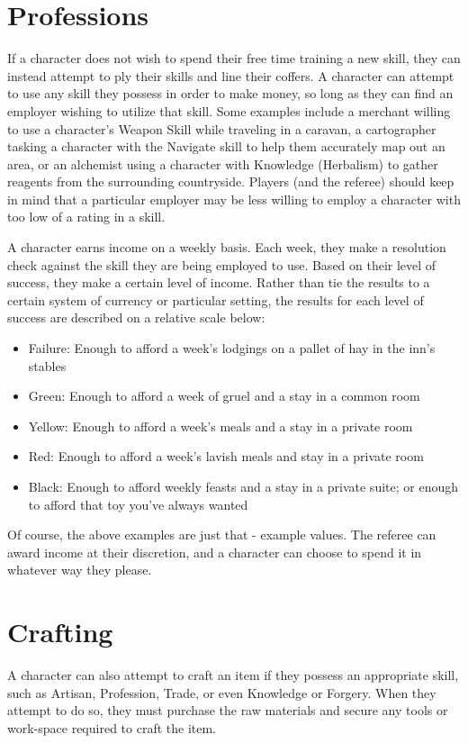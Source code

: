 \documentclass[oneside]{book}
\begin{document}
\begin{multicols}{2}
\section{Professions}

If a character does not wish to spend their free time training a new skill, they can instead attempt to ply their skills and line their coffers. A character can attempt to use any skill they possess in order to make money, so long as they can find an employer wishing to utilize that skill. Some examples include a merchant willing to use a character's Weapon Skill while traveling in a caravan, a cartographer tasking a character with the Navigate skill to help them accurately map out an area, or an alchemist using a character with Knowledge (Herbalism) to gather reagents from the surrounding countryside. Players (and the referee) should keep in mind that a particular employer may be less willing to employ a character with too low of a rating in a skill. 

A character earns income on a weekly basis. Each week, they make a resolution check against the skill they are being employed to use. Based on their level of success, they make a certain level of income. Rather than tie the results to a certain system of currency or particular setting, the results for each level of success are described on a relative scale below:  

\begin{itemize}
		\setlength{\itemsep}{0cm}%
  		\setlength{\parskip}{0cm}%
		\item{Failure: Enough to afford a week's lodgings on a pallet of hay in the inn's stables }
		\item{Green: Enough to afford a week of gruel and a stay in a common room }
		\item{Yellow: Enough to afford a week's meals and a stay in a private room }
		\item{Red: Enough to afford a week's lavish meals and stay in a private room }
		\item{Black: Enough to afford weekly feasts and a stay in a private suite; or enough to afford that toy you've always wanted}
	\end{itemize}

Of course, the above examples are just that - example values. The referee can award income at their discretion, and a character can choose to spend it in whatever way they please. 

\section{Crafting}
A character can also attempt to craft an item if they possess an appropriate skill, such as Artisan, Profession, Trade, or even Knowledge or Forgery. When they attempt to do so, they must purchase the raw materials and secure any tools or work-space required to craft the item.


\end{multicols}
\end{document}
